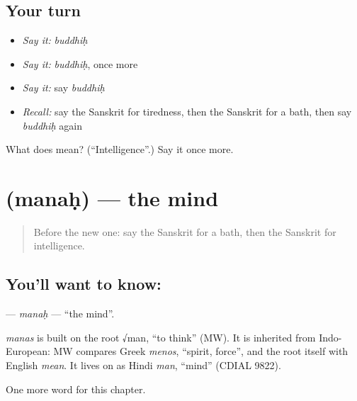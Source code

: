 \subsection*{Your turn}
\begin{itemize}
\raggedright
  \item \emph{Say it:} \emph{buddhiḥ}
  \item \emph{Say it:} \emph{buddhiḥ}, once more
  \item \emph{Say it:} say \emph{buddhiḥ}
  \item \emph{Recall:} say the Sanskrit for tiredness, then the Sanskrit for a bath, then say \emph{buddhiḥ} again
\end{itemize}

\begin{tcolorbox}[breakable,colback=teal!4,colframe=teal!35!black,title={Before you move on}]
What does  mean? (\textquotedblleft{}Intelligence\textquotedblright{}.) Say it once more.
\end{tcolorbox}
\section[\texorpdfstring{\sk{मनः} (manaḥ)}{मनः (manaḥ)}]{ (manaḥ) — the mind}

\label{lesson:SA-C212-manah}



\begin{quote}
Before the new one: say the Sanskrit for a bath, then the Sanskrit for intelligence.
\end{quote}

\subsection*{You'll want to know: }
\textbf{} — \emph{manaḥ} — \textquotedblleft{}the mind\textquotedblright{}.

\begin{cousinweb}
\emph{manas} is built on the root √man, \textquotedblleft{}to think\textquotedblright{} (MW). It is inherited from Indo-European: MW compares Greek \emph{menos}, \textquotedblleft{}spirit, force\textquotedblright{}, and the root itself with English \emph{mean}. It lives on as Hindi \emph{man}, \textquotedblleft{}mind\textquotedblright{} (CDIAL 9822).
\end{cousinweb}

\begin{grammarlens}[title={What you've built}]
One more word for this chapter.
\end{grammarlens}

